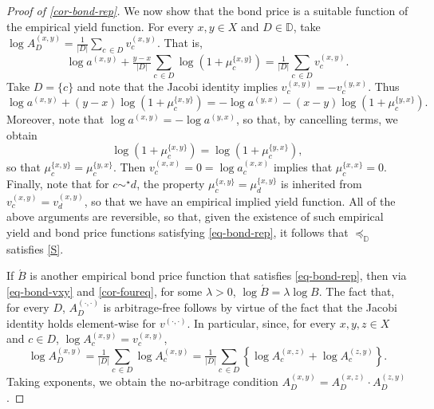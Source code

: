 \documentclass[ecta,nameyear,draft]{econsocart}
\newcommand{\mbbd}{{\mathds D}}
\newcommand{\xx}{(x,x)}
\newcommand{\xy}{{(x, y)}}
\newcommand{\yx}{{(y, x)}}
\newcommand{\zy}{{(z,y)}}
\newcommand{\xz}{{(x,z)}}
\newcommand{\dd}{{(\cdot,\cdot)}}
\newcommand{\stability}{\ref{S}}
\theoremstyle{plain}
\theoremstyle{remark}
\begin{document}
\begin{proof}[Proof of \cref{cor-bond-rep}]
  We now show that the bond price is a suitable function of the empirical yield
  function.  For every $x,y \in X$ and $D \in \mbbd$, take $\log {A}^{\xy}_{D}
  = \tfrac{1}{\lvert D\rvert}\sum_{c\,\in D}v^{\xy}_{c}$.  That is,
  \begin{equation*}
    \log a^{\xy} + \tfrac{y - x}{\lvert D\rvert} \sum_{c\,\in D}\log
    \left(1+\mu^{\{x,y\}}_{c}\right) = \tfrac{1}{\lvert D\rvert}\sum_{c\,\in D}
    v^{\xy}_{c}. 
  \end{equation*}
  Take $D = \{c\}$ and note that the Jacobi identity implies $v^{\xy}_c = -
  v^{\yx}_c$. Thus
  \begin{equation*}
    \log a^{\xy} + (y - x) \log \left(1+\mu^{\{x,y\}}_{c}\right)
    = -\log a^{\yx} - (x - y) \log \left(1+\mu^{\{y,x\}}_{c}\right).
  \end{equation*}
  Moreover, note that $\log a^{\xy} = -\log a^{\yx}$, so that, by cancelling
  terms, we obtain
  \begin{equation}\label{eq-mu-sym}
    \log \left(1+\mu^{\{x,y\}}_{c}\right) = \log \left(1+\mu^{\{y,x\}}_{c}\right),
  \end{equation}
  so that $\mu^{\{x,y\}}_{c} = \mu^{\{y,x\}}_{c}$. Then $v^{\xx}_{c} = 0 = \log
  a^{\xx}_{c} $ implies that $\mu^{\{x,x\}}_{c} = 0$. Finally, note that for $c
  \sim^{\star} d$, the property $\mu^{\{x,y\}}_{c} = \mu^{\{x,y\}}_{d}$ is
  inherited from $v^{\xy}_{c} = v^{\xy}_{d}$, so that we have an empirical
  implied yield function. All of the above arguments are reversible, so that,
  given the existence of such empirical yield and bond price functions
  satisfying \eqref{eq-bond-rep}, it follows that $\preceq_{\mbbd}$ satisfies
  \stability.

  If $\acute{B}$ is another empirical bond price function that satisfies
  \eqref{eq-bond-rep}, then via \cref{eq-bond-vxy} and \cref{cor-foureq}, for
  some $\lambda >0$, $\log \acute{B} = \lambda \log B$.  The fact that, for every
  $D$, ${A}^{\dd}_{D}$ is arbitrage-free follows by virtue of the fact that the
  Jacobi identity holds element-wise for $v^{\dd}$.  In particular, since, for
  every $x, y , z \in X$ and $c \in D$, $\log {A}^{\xy}_{c} = v^{\xy}_{c}$, 
  \begin{equation*}
    \log {A}^{\xy}_{D} = \tfrac{1}{\lvert D\rvert}\sum_{c\,\in D}\log
    {A}^{\xy}_c
    = \tfrac{1}{\lvert D\rvert}\sum_{c\,\in D} \left\{\log {A}^{\xz}_c + \log
    {A}^{\zy}_c \right\}.
  \end{equation*} 
  Taking exponents, we obtain the no-arbitrage condition ${A}^{\xy}_{D} =
  {A}^{\xz}_{D} \cdot {A}^{\zy}_{D}$.
\end{proof}
\end{document}
